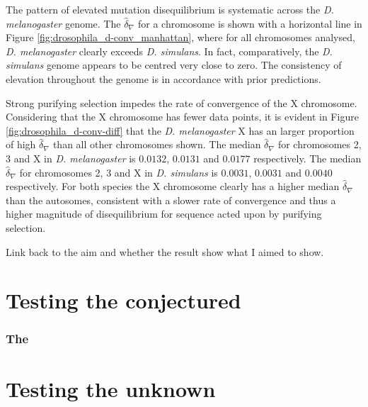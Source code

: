 

The pattern of elevated mutation disequilibrium is systematic across the \textit{D. melanogaster} genome. The $\hat \delta_\nabla$ for a chromosome is shown with a horizontal line in Figure \ref{fig:drosophila_d-conv_manhattan}, where for all chromosomes analysed, \textit{D. melanogaster} clearly exceeds \textit{D. simulans}. In fact, comparatively, the \textit{D. simulans} genome appears to be centred very close to zero. The consistency of elevation throughout the genome is in accordance with prior predictions.

Strong purifying selection impedes the rate of convergence of the X chromosome. Considering that the X chromosome has fewer data points, it is evident in Figure \ref{fig:drosophila_d-conv-diff} that the \textit{D. melanogaster} X has an larger proportion of high $\hat \delta_\nabla$ than all other chromosomes shown. The median $\hat \delta_\nabla$ for chromosomes 2, 3 and X in \textit{D. melanogaster} is $0.0132$, $0.0131$ and $0.0177$ respectively. The median $\hat \delta_\nabla$ for chromosomes 2, 3 and X in \textit{D. simulans} is $0.0031$, $0.0031$ and $0.0040$ respectively. For both species the X chromosome clearly has a higher median $\hat \delta_\nabla$ than the autosomes, consistent with a slower rate of convergence and thus a higher magnitude of disequilibrium for sequence acted upon by purifying selection. 



Link back to the aim and whether the result show what I aimed to show. 


\section*{Testing the conjectured}





\subsubsection{The }



\section*{Testing the unknown}